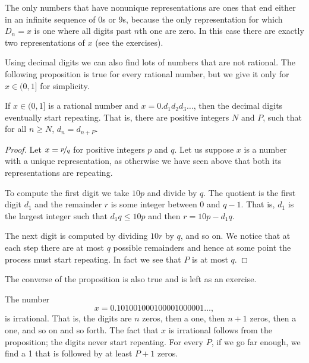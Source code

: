 \documentclass[12pt]{book}
\begin{document}
The only numbers that have nonunique
representations are ones that end either in an infinite sequence of $0$s
or $9$s, because the only representation for which
$D_n = x$ is one where all digits past $n$th one are zero.
In this case
there are exactly two representations of $x$ (see the exercises).

Using decimal digits we can also find lots of numbers that are not rational.
The following proposition is true for every
rational number, but we give it only for $x \in (0,1]$ for simplicity.

\begin{prop} \label{prop:rationaldecimal}
If $x \in (0,1]$ is a rational number and $x = 0.d_1d_2d_3\ldots$,
then the decimal digits eventually start repeating.
That is, there are 
positive integers $N$ and $P$, such that for all $n \geq N$, $d_n = d_{n+P}$.
\end{prop}

\begin{proof}
Let $x = \nicefrac{p}{q}$ for positive integers $p$ and $q$.
Let us suppose $x$ is a number with a unique representation, as
otherwise we have seen above that both its representations are repeating.

To compute the first digit we take $10 p$ and divide by
$q$.
The quotient is the first digit $d_1$ and the remainder $r$ is some integer
between 0 and $q-1$.
That is, $d_1$ is the largest integer
such that $d_1 q \leq 10p$ and then $r = 10p - d_1q$.

The next digit is computed by dividing $10 r$ by $q$, and so on.
We notice that at each step there are at most $q$ possible remainders
and hence at some point the process must start repeating.
In fact we see that $P$ is at most $q$.
\end{proof}

The converse of the proposition is also true and is left as an exercise.

\begin{example}
The number
\begin{equation*}
x = 0.101001000100001000001\ldots,
\end{equation*}
is irrational.
That is, the digits are $n$ zeros, then a one, then $n+1$
zeros, then a one, and so on and so forth.
The fact that $x$ is irrational follows from the
proposition; the digits never start repeating.
For every $P$,
if we go far enough, we find a 1 that is followed by at least $P+1$ zeros.
\end{example}
\end{document}
